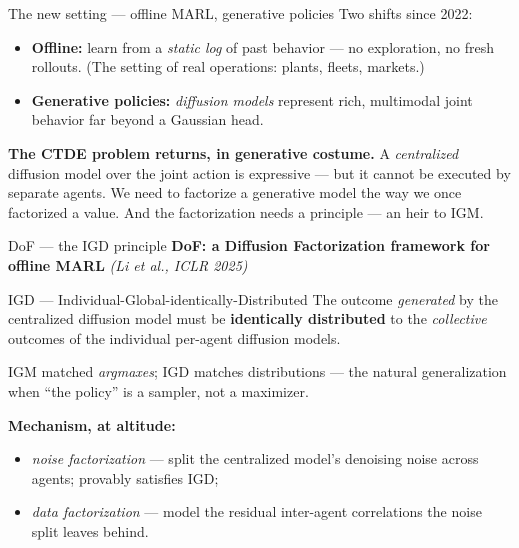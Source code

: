 \documentclass[10pt, aspectratio=169]{beamer}
\newcommand{\paper}[1]{\textcolor{mLightBrown}{\small\textit{(#1)}}}
\begin{document}
\begin{frame}{The new setting --- offline MARL, generative policies}
Two shifts since 2022:
\begin{itemize}\setlength\itemsep{3pt}
\item \textbf{Offline:} learn from a \emph{static log} of past behavior --- no exploration, no fresh rollouts. (The setting of real operations: plants, fleets, markets.)
\item \textbf{Generative policies:} \emph{diffusion models} represent rich, multimodal joint behavior far beyond a Gaussian head.
\end{itemize}
\medskip

\pause
\textbf{The CTDE problem returns, in generative costume.} A \emph{centralized} diffusion model over the joint action is expressive --- but it cannot be executed by separate agents. We need to \alert{factorize a generative model} the way we once factorized a value.
\medskip
\pause
And the factorization needs a principle --- an heir to IGM.
\end{frame}

\begin{frame}{DoF --- the IGD principle}
\textbf{DoF: a Diffusion Factorization framework for offline MARL} \paper{Li et al., ICLR 2025}
\medskip
\begin{block}{IGD --- Individual-Global-identically-Distributed}
\centering
The outcome \emph{generated} by the centralized diffusion model must be \textbf{identically distributed} to the \emph{collective} outcomes of the individual per-agent diffusion models.
\end{block}
\medskip

IGM matched \emph{argmaxes}; IGD matches \alert{distributions} --- the natural generalization when ``the policy'' is a sampler, not a maximizer.
\medskip

\pause
\textbf{Mechanism, at altitude:}
\begin{itemize}\setlength\itemsep{2pt}
\item \emph{noise factorization} --- split the centralized model's denoising noise across agents; provably satisfies IGD;
\item \emph{data factorization} --- model the residual inter-agent correlations the noise split leaves behind.
\end{itemize}
\end{frame}
\end{document}
